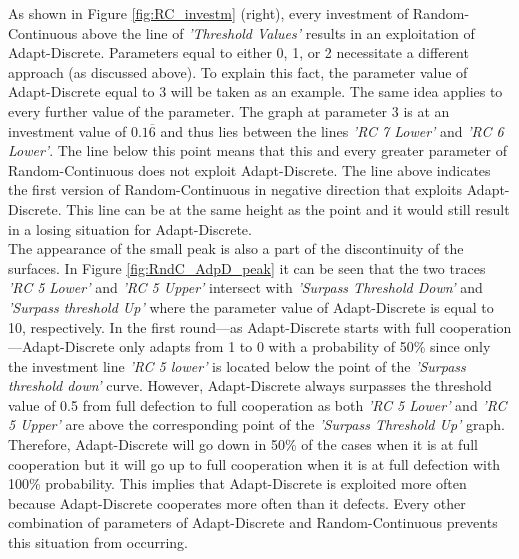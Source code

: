 \documentclass[11pt]{article}
\begin{document}
	\noindent
	As shown in Figure \ref{fig:RC_investm} (right), every investment of Random-Continuous above the line of \textit{'Threshold Values'} results in an exploitation of Adapt-Discrete.
	Parameters equal to either 0, 1, or 2 necessitate a different approach (as discussed above).
	To explain this fact, the parameter value of Adapt-Discrete equal to 3 will be taken as an example.
	The same idea applies to every further value of the parameter.
	The graph at parameter 3 is at an investment value of $0.1\overline{6}$ and thus lies between the lines \textit{'RC 7 Lower'} and \textit{'RC 6 Lower'}.
	The line below this point means that this and every greater parameter of Random-Continuous does not exploit Adapt-Discrete.
	The line above indicates the first version of Random-Continuous in negative direction that exploits Adapt-Discrete.
	This line can be at the same height as the point and it would still result in a losing situation for Adapt-Discrete.\\
	
	\noindent 
	The appearance of the small peak is also a part of the discontinuity of the surfaces.
	In Figure \ref{fig:RndC_AdpD_peak} it can be seen that the two traces \textit{'RC 5 Lower'} and \textit{'RC 5 Upper'} intersect with \textit{'Surpass Threshold Down'} and \textit{'Surpass threshold Up'} where the parameter value of Adapt-Discrete is equal to 10, respectively.
	In the first round---as Adapt-Discrete starts with full cooperation---Adapt-Discrete only adapts from 1 to 0 with a probability of 50\% since only the investment line \textit{'RC 5 lower'} is located below the point of the \textit{'Surpass threshold down'} curve.
	However, Adapt-Discrete always surpasses the threshold value of 0.5 from full defection to full cooperation as both \textit{'RC 5 Lower'} and \textit{'RC 5 Upper'} are above the corresponding point of the \textit{'Surpass Threshold Up'} graph.
	Therefore, Adapt-Discrete will go down in 50\% of the cases when it is at full cooperation but it will go up to full cooperation when it is at full defection with 100\% probability.
	This implies that Adapt-Discrete is exploited more often because Adapt-Discrete cooperates more often than it defects.
	Every other combination of parameters of Adapt-Discrete and Random-Continuous prevents this situation from occurring.
\end{document}
